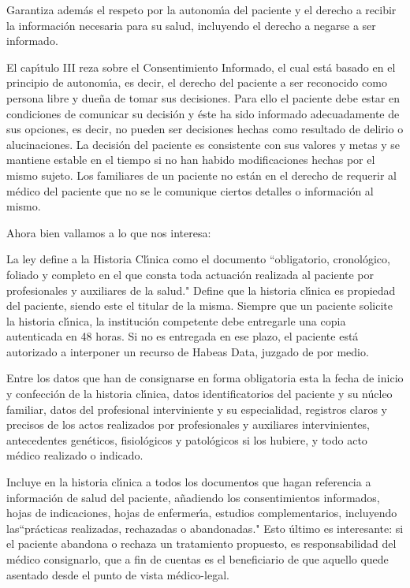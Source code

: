 \begin{Itemize}
Garantiza adem\'as el respeto por la autonom\'{\i}a del paciente y el derecho a recibir 
la informaci\'on necesaria para su salud, incluyendo el derecho a negarse a ser 
informado.

El cap\'{\i}tulo III reza sobre el Consentimiento Informado, el cual est\'a basado en 
el principio de autonom\'{\i}a, es decir, el derecho del paciente a ser reconocido 
como persona libre y due\~na de tomar sus decisiones. Para ello el paciente debe estar en 
condiciones de comunicar su decisi\'on y  \'este ha sido informado adecuadamente de 
sus opciones, es decir, no pueden ser decisiones hechas como resultado de delirio 
o alucinaciones. La decisi\'on del paciente es consistente con sus valores y metas 
y se mantiene estable en el tiempo si no han habido modificaciones hechas por
el mismo sujeto. Los familiares de un paciente no est\'an en el derecho de 
requerir al m\'edico del paciente que no se le comunique ciertos detalles o
informaci\'on al mismo. 

Ahora bien vallamos a lo que nos interesa:

La ley define a la Historia Cl\'{\i}nica como el documento ``obligatorio, cronol\'ogico,
foliado y completo en el que consta toda actuaci\'on realizada al paciente por
profesionales y auxiliares de la salud." Define que la historia cl\'{\i}nica es 
propiedad del paciente, siendo este el titular de la misma. Siempre que un paciente 
solicite la historia cl\'{\i}nica, la instituci\'on competente debe entregarle una copia
autenticada en 48 horas. Si no es entregada en ese plazo, el
paciente est\'a autorizado a interponer un recurso de Habeas Data, juzgado de por 
medio. 

Entre los datos que han de consignarse en forma obligatoria esta la fecha de 
inicio y confecci\'on de la historia cl\'{\i}nica, datos identificatorios del paciente
y su n\'ucleo familiar, datos del profesional interviniente y su especialidad, 
registros claros y precisos de los actos realizados por profesionales y auxiliares
intervinientes, antecedentes gen\'eticos, fisiol\'ogicos y patol\'ogicos si los hubiere,
y todo acto m\'edico realizado o indicado.

Incluye en la historia cl\'{\i}nica a todos los documentos que hagan referencia a 
informaci\'on de salud del paciente, a\~nadiendo los consentimientos informados, 
hojas de indicaciones, hojas de enfermer\'{\i}a, estudios complementarios, 
incluyendo las``pr\'acticas realizadas, rechazadas o abandonadas." 
Esto  \'ultimo es interesante: si el paciente abandona o rechaza un tratamiento 
propuesto, es responsabilidad del m\'edico consignarlo, que a fin de cuentas es el
beneficiario de que aquello quede asentado desde el punto de vista m\'edico-legal.


\end{Itemize}

